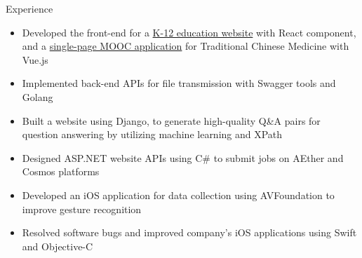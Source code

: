 \begin{MySection}{Experience}
    \\

    \begin{itemize}
        \item Developed the front-end 
        for a \href{http://k12mlmq.com/}{K-12 education website} 
        with React component,
        and a \href{http://www.ml-mq.com/}{single-page MOOC application} 
        for Traditional Chinese Medicine 
        with Vue.js
        \item Implemented back-end APIs 
        for file transmission
        with Swagger tools and Golang
    \end{itemize}

    \begin{itemize}
        \item Built a website using Django,
        to generate high-quality Q\&A pairs
        for question answering
        by utilizing machine learning and XPath
        \item Designed ASP.NET website APIs
        using C\# to submit jobs
        on AEther and Cosmos platforms
    \end{itemize}

    \begin{itemize}
        \item Developed an iOS application
        for data collection
        using AVFoundation
        to improve gesture recognition
        \item Resolved software bugs
        and improved company's iOS applications
        using Swift and Objective-C
    \end{itemize}\vspace{-12pt}
\end{MySection}